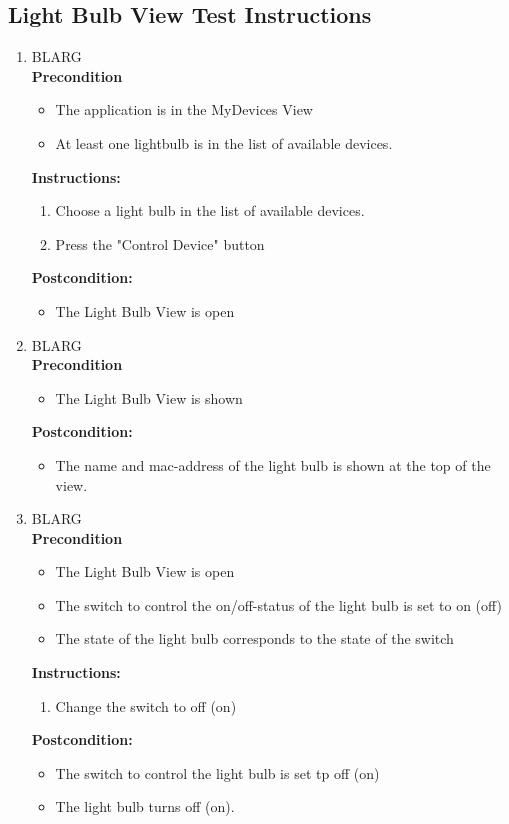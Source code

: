 \documentclass[a4paper]{article}
\newlength{\testlabellength}
\newenvironment{testlist}{\begin{enumerate}[label=\bfseries Instruction \thesubsection.\arabic* , labelindent=0pt, labelwidth=\testlabellength , leftmargin=2cm]}{\end{enumerate}}
\newenvironment{precondition}{
{\color{white}BLARG}\\ 
\textbf{Precondition}
\begin{itemize}[labelindent=0cm, labelwidth=2cm , leftmargin=1cm]
}
{\end{itemize}}
\newenvironment{instruction}{
\textbf{Instructions:}
\begin{enumerate}[label=\bfseries  \arabic*., labelindent=0cm, labelwidth=2cm , leftmargin=1cm]
}
{\end{enumerate}}
\newenvironment{postcondition}{
\textbf{Postcondition:}
\begin{itemize}[labelindent=0cm, labelwidth=2cm , leftmargin=1cm]
}
{\end{itemize}}
\begin{document}
\begin{appendices}
\subsection{Light Bulb View Test Instructions}
\begin{testlist}

    \item 	\begin{precondition}
    			\item The application is in the MyDevices View
    			\item At least one lightbulb is in the list of available devices.
    		\end{precondition}
    		\begin{instruction}
    				\item Choose a light bulb in the list of available devices.
    				\item Press the "Control Device" button
    		\end{instruction}
    		\begin{postcondition}
    			\item The Light Bulb View is open
    		\end{postcondition}

	
	\item 	\begin{precondition}
				\item The Light Bulb View is shown
			\end{precondition}
    		\begin{postcondition}
    			\item The name and mac-address of the light bulb is shown at the top of the view.
    		\end{postcondition}
    	
	
	\item 	\begin{precondition}
				\item The Light Bulb View is open
				\item The switch to control the on/off-status of the light bulb is set to on (off)
				\item The state of the light bulb corresponds to the state of the switch
			\end{precondition}
    		\begin{instruction}
    			\item Change the switch to off (on)
    		\end{instruction}
    		\begin{postcondition}
    			\item The switch to control the light bulb is set tp off (on)
    			\item The light bulb turns off (on).
    		\end{postcondition}
    		

\end{testlist}
\end{appendices}
\end{document}
